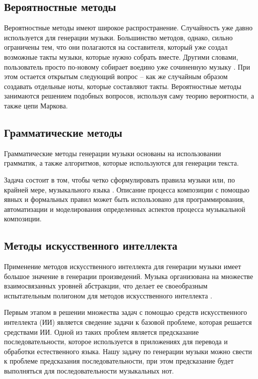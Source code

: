\subsection{Вероятностные методы}

Вероятностные методы имеют широкое распространение. Случайность уже давно используется для генерации музыки. Большинство методов, однако, сильно ограничены тем, что они полагаются на составителя, который уже создал возможные такты музыки, которые нужно собрать вместе. Другими словами, пользователь просто по-новому собирает воедино уже сочиненную музыку \cite{prob-methods}. При этом остается открытым следующий вопрос -- как же случайным образом создавать отдельные ноты, которые составляют такты. Вероятностные методы занимаются решением подобных вопросов, используя саму теорию вероятности, а также цепи Маркова.


\subsection{Грамматические методы}

Грамматические методы генерации музыки основаны на использовании грамматик, а также алгоритмов, которые используются для генерации текста. 

Задача состоит в том, чтобы четко сформулировать правила музыки или, по крайней мере, музыкального языка \cite{gram-methods}. Описание процесса композиции с помощью явных и формальных правил может быть использовано для программирования, автоматизации и моделирования определенных аспектов процесса музыкальной композиции.


\subsection{Методы искусственного интеллекта}

Применение методов искусственного интеллекта для генерации музыки имеет большое значение в генерации произведений. Музыка организована на множестве взаимосвязанных уровней абстракции, что делает ее своеобразным испытательным полигоном для методов искусственного интеллекта \cite{ai-methods}.

Первым этапом в решении множества задач с помощью средств искусственного интеллекта (ИИ) является сведение задачи к базовой проблеме, которая решается средствами ИИ. Одной из таких проблем является предсказание последовательности, которое используется в приложениях для перевода и обработки естественного языка. Нашу задачу по генерации музыки можно свести к проблеме предсказания последовательности, при этом предсказание будет выполняться для последовательности музыкальных нот.

